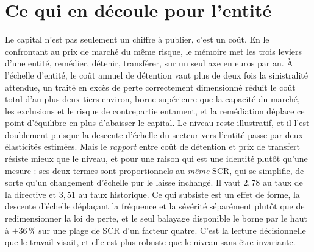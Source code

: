 \section{Ce qui en découle pour l'entité}
Le capital n'est pas seulement un chiffre à publier, c'est un coût. En le confrontant au prix
de marché du même risque, le mémoire met les trois leviers d'une entité, remédier, détenir,
transférer, sur un seul axe en euros par an. À l'échelle d'entité, le coût annuel de détention
vaut plus de deux fois la sinistralité attendue, un traité en excès de perte correctement
dimensionné réduit le coût total d'au plus deux tiers environ, borne supérieure que la capacité
du marché, les exclusions et le risque de contrepartie entament, et la remédiation déplace ce point
d'équilibre en plus d'abaisser le capital. Le niveau reste illustratif, et il l'est doublement
puisque la descente d'échelle du secteur vers l'entité passe par deux élasticités estimées.
Mais le \emph{rapport} entre coût de détention et prix de transfert résiste mieux que le
niveau, et pour une raison qui est une identité plutôt qu'une mesure : ses deux termes
sont proportionnels au \emph{même} SCR, qui se simplifie, de sorte qu'un changement d'échelle
pur le laisse inchangé. Il vaut $2{,}78$ au taux de la directive et $3{,}51$ au taux
historique. Ce qui subsiste est un effet de forme, la descente d'échelle déplaçant la
fréquence et la sévérité séparément plutôt que de redimensionner la loi de perte, et le seul
balayage disponible le borne par le haut à $+36\,\%$ sur une plage de SCR d'un facteur quatre.
C'est la lecture décisionnelle que le travail visait, et elle est plus robuste que le niveau
sans être invariante.


